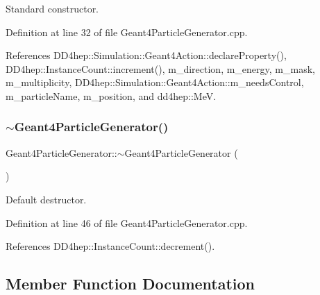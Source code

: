 Standard constructor. 



Definition at line 32 of file Geant4\+Particle\+Generator.\+cpp.



References D\+D4hep\+::\+Simulation\+::\+Geant4\+Action\+::declare\+Property(), D\+D4hep\+::\+Instance\+Count\+::increment(), m\+\_\+direction, m\+\_\+energy, m\+\_\+mask, m\+\_\+multiplicity, D\+D4hep\+::\+Simulation\+::\+Geant4\+Action\+::m\+\_\+needs\+Control, m\+\_\+particle\+Name, m\+\_\+position, and dd4hep\+::\+MeV.

\hypertarget{class_d_d4hep_1_1_simulation_1_1_geant4_particle_generator_a4fdb46f784ede918c2970e260e2fe218}{}\label{class_d_d4hep_1_1_simulation_1_1_geant4_particle_generator_a4fdb46f784ede918c2970e260e2fe218} 
\subsubsection{\texorpdfstring{$\sim$\+Geant4\+Particle\+Generator()}{~Geant4ParticleGenerator()}}
{\footnotesize\ttfamily Geant4\+Particle\+Generator\+::$\sim$\+Geant4\+Particle\+Generator (\begin{DoxyParamCaption}{ }\end{DoxyParamCaption})\hspace{0.3cm}{\ttfamily [virtual]}}



Default destructor. 



Definition at line 46 of file Geant4\+Particle\+Generator.\+cpp.



References D\+D4hep\+::\+Instance\+Count\+::decrement().



\subsection{Member Function Documentation}
\hypertarget{class_d_d4hep_1_1_simulation_1_1_geant4_particle_generator_a877449e84d0d8ccf2ca52584db3b0fab}{}\label{class_d_d4hep_1_1_simulation_1_1_geant4_particle_generator_a877449e84d0d8ccf2ca52584db3b0fab} 
